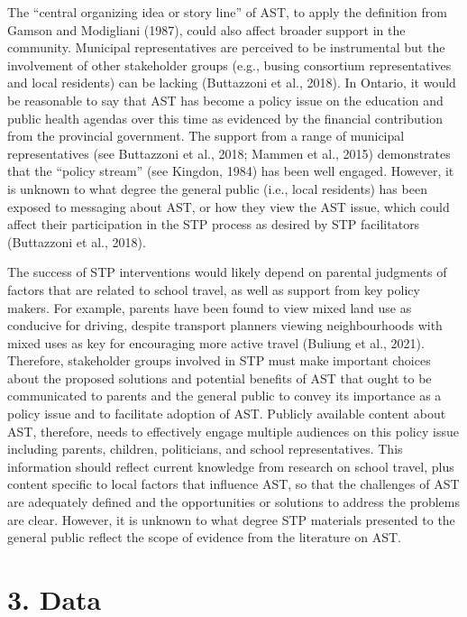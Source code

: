 \documentclass[]{elsarticle} %
\begin{document}
The ``central organizing idea or story line'' of AST, to apply the
definition from Gamson and Modigliani (1987), could also affect broader
support in the community. Municipal representatives are perceived to be
instrumental but the involvement of other stakeholder groups (e.g.,
busing consortium representatives and local residents) can be lacking
(Buttazzoni et al., 2018). In Ontario, it would be reasonable to say
that AST has become a policy issue on the education and public health
agendas over this time as evidenced by the financial contribution from
the provincial government. The support from a range of municipal
representatives (see Buttazzoni et al., 2018; Mammen et al., 2015)
demonstrates that the ``policy stream'' (see Kingdon, 1984) has been
well engaged. However, it is unknown to what degree the general public
(i.e., local residents) has been exposed to messaging about AST, or how
they view the AST issue, which could affect their participation in the
STP process as desired by STP facilitators (Buttazzoni et al., 2018).

The success of STP interventions would likely depend on parental
judgments of factors that are related to school travel, as well as
support from key policy makers. For example, parents have been found to
view mixed land use as conducive for driving, despite transport planners
viewing neighbourhoods with mixed uses as key for encouraging more
active travel (Buliung et al., 2021). Therefore, stakeholder groups
involved in STP must make important choices about the proposed solutions
and potential benefits of AST that ought to be communicated to parents
and the general public to convey its importance as a policy issue and to
facilitate adoption of AST. Publicly available content about AST,
therefore, needs to effectively engage multiple audiences on this policy
issue including parents, children, politicians, and school
representatives. This information should reflect current knowledge from
research on school travel, plus content specific to local factors that
influence AST, so that the challenges of AST are adequately defined and
the opportunities or solutions to address the problems are clear.
However, it is unknown to what degree STP materials presented to the
general public reflect the scope of evidence from the literature on AST.

\hypertarget{data}{%
\section{3. Data}\label{data}}
\end{document}
